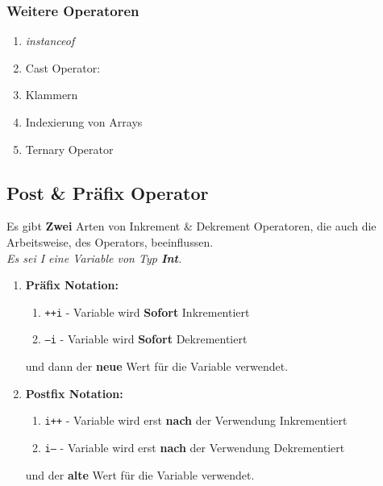 \documentclass[12pt, a4paper]{article}
\begin{document}
\subsubsection*{Weitere Operatoren}
\begin{enumerate}[label=$\alph*)$]
    \item \textit{instanceof} 
    \item Cast Operator: \text{( )}
    \item Klammern \text{( )}
    \item Indexierung von Arrays \text{[ ]}
    \item Ternary Operator 
\end{enumerate}
\newpage
\subsection*{Post \& Präfix Operator}
Es gibt \textbf{Zwei} Arten von Inkrement \& Dekrement Operatoren, die auch die Arbeitsweise, des Operators, beeinflussen. \vspace{0.5cm} \\
\textit{Es sei I eine Variable von Typ \textbf{Int}.}
\begin{enumerate}[label=$\alph*)$]
    \item \textbf{Präfix Notation:}
    \begin{enumerate}[label=]
        \item \texttt{++i} - Variable wird \textbf{Sofort} Inkrementiert
        \item \texttt{--i} - Variable wird \textbf{Sofort} Dekrementiert
    \end{enumerate}
    und dann der \textbf{neue} Wert für die Variable verwendet.
    \item \textbf{Postfix Notation:}  
    \begin{enumerate}[label=]
        \item \texttt{i++} - Variable wird erst \textbf{nach} der Verwendung Inkrementiert
        \item \texttt{i--} - Variable wird erst \textbf{nach} der Verwendung Dekrementiert
    \end{enumerate}
    und der \textbf{alte} Wert für die Variable verwendet.
\end{enumerate}
\newpage
\end{document}
